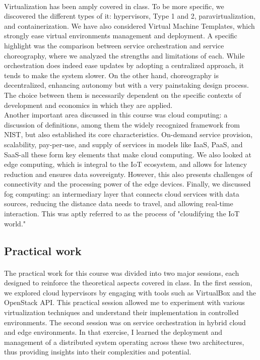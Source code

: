 \paragraph{}Virtualization has been amply covered in class. To be more specific, we discovered the different types of it: hypervisors, Type 1 and 2, paravirtualization, and containerization. We have also considered Virtual Machine Templates, which strongly ease virtual environments management and deployment. A specific highlight was the comparison between service orchestration and service choreography, where we analyzed the strengths and limitations of each. While orchestration does indeed ease updates by adopting a centralized approach, it tends to make the system slower. On the other hand, choreography is decentralized, enhancing autonomy but with a very painstaking design process. The choice between them is necessarily dependent on the specific contexts of development and economics in which they are applied.\\

Another important area discussed in this course was cloud computing: a discussion of definitions, among them the widely recognized framework from NIST, but also established its core characteristics. On-demand service provision, scalability, pay-per-use, and supply of services in models like IaaS, PaaS, and SaaS-all these form key elements that make cloud computing. We also looked at edge computing, which is integral to the IoT ecosystem, and allows for latency reduction and ensures data sovereignty. However, this also presents challenges of connectivity and the processing power of the edge devices. Finally, we discussed fog computing: an intermediary layer that connects cloud services with data sources, reducing the distance data needs to travel, and allowing real-time interaction. This was aptly referred to as the process of "cloudifying the IoT world."

\subsection{Practical work}
\paragraph{}The practical work for this course was divided into two major sessions, each designed to reinforce the theoretical aspects covered in class. In the first session, we explored cloud hypervisors by engaging with tools such as VirtualBox and the OpenStack API. This practical session allowed me to experiment with various virtualization techniques and understand their implementation in controlled environments. The second session was on service orchestration in hybrid cloud and edge environments. In that exercise, I learned the deployment and management of a distributed system operating across these two architectures, thus providing insights into their complexities and potential.

